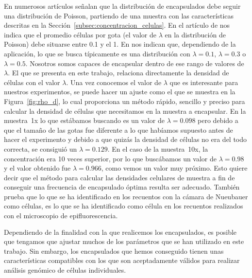 En numerosos artículos señalan que la distribución de encapsulados debe seguir una distribución de Poisson, partiendo de una muestra con las características descritas en la Sección~\ref{subsec:concentracion_celulas}. En el artículo de \cite{article:haakan} nos indica que el promedio células por gota (el valor de $\lambda$ en la distribución de Poisson) debe situarse entre 0.1 y el 1. En \cite{article:sarah} nos indican que, dependiendo de la aplicación, lo que se busca típicamente es una distribución con $\lambda=0.1$, $\lambda=0.3$ o $\lambda=0.5$. Nosotros somos capaces de encapsular dentro de ese rango de valores de $\lambda$.
El  que se presenta en este trabajo, relaciona directamente la densidad de células con el valor $\lambda$. Una vez conocemos el valor de $\lambda$ que es interesante para nuestros experimentos, se puede hacer un ajuste como el que se muestra en la Figura~\ref{fig:rho_d}, lo cual proporciona un método rápido, sencillo y preciso para calcular la densidad de células que necesitamos en la muestra a encapsular.
En la muestra~1x lo que estábamos buscando es un valor de $\lambda=0.098$ pero debido a que el tamaño de las gotas fue diferente a lo que habíamos supuesto antes de hacer el experimento y debido a que quizás la densidad de células no era del todo correcta, se consiguió un $\lambda=0.129$. En el caso de la muestra~10x, la concentración era 10 veces superior, por lo que buscábamos un valor de $\lambda=0.98$ y el valor obtenido fue $\lambda=0.966$, como vemos un valor muy próximo. Esto quiere decir que el método para calcular las densidades celulares de muestra a fin de conseguir una frecuencia de encapsulado óptima resulta ser adecuado. También prueba que lo que se ha identificado en los recuentos con la cámara de Nueubauer como células, es lo que se ha identificado como célula en los recuentos realizados con el microscopio de epifluorescencia.

Dependiendo de la finalidad con la que realicemos los encapsulados, es posible que tengamos que ajustar muchos de los parámetros que se han utilizado en este trabajo. Sin embargo, los encapsulados que hemos conseguido tienen unas características compatibles con los que son aceptadamente válidos para realizar análisis genómico de células individuales.







